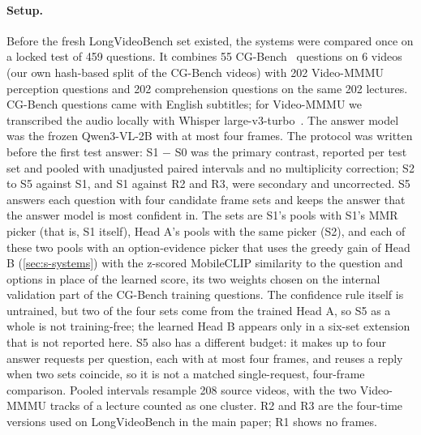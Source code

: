 \paragraph{Setup.}
Before the fresh LongVideoBench set existed, the systems were compared once on a locked test of 459 questions.
It combines 55 CG-Bench~\cite{chen2024cgbench} questions on 6 videos (our own hash-based split of the CG-Bench videos) with 202 Video-MMMU~\cite{hu2025videommmu} perception questions and 202 comprehension questions on the same 202 lectures.
CG-Bench questions came with English subtitles; for Video-MMMU we transcribed the audio locally with Whisper large-v3-turbo~\cite{radford2023whisper}.
The answer model was the frozen Qwen3-VL-2B with at most four frames.
The protocol was written before the first test answer: S1 $-$ S0 was the primary contrast, reported per test set and pooled with unadjusted paired intervals and no multiplicity correction; S2 to S5 against S1, and S1 against R2 and R3, were secondary and uncorrected.
S5 answers each question with four candidate frame sets and keeps the answer that the answer model is most confident in.
The sets are S1's pools with S1's MMR picker (that is, S1 itself), Head A's pools with the same picker (S2), and each of these two pools with an option-evidence picker that uses the greedy gain of Head B (\cref{sec:s-systems}) with the z-scored MobileCLIP similarity to the question and options in place of the learned score, its two weights chosen on the internal validation part of the CG-Bench training questions.
The confidence rule itself is untrained, but two of the four sets come from the trained Head A, so S5 as a whole is not training-free; the learned Head B appears only in a six-set extension that is not reported here.
S5 also has a different budget: it makes up to four answer requests per question, each with at most four frames, and reuses a reply when two sets coincide, so it is not a matched single-request, four-frame comparison.
Pooled intervals resample 208 source videos, with the two Video-MMMU tracks of a lecture counted as one cluster.
R2 and R3 are the four-time versions used on LongVideoBench in the main paper; R1 shows no frames.


